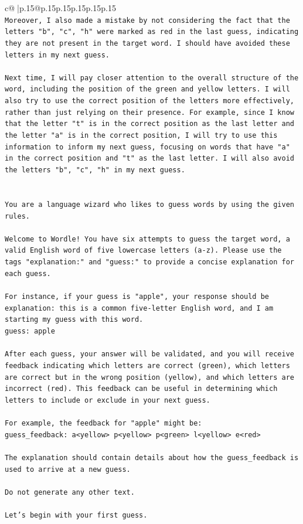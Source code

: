 \documentclass{article}
\begin{document}
{\begin{supertabular}{c@{$\;$}|p{.15\linewidth}@{}p{.15\linewidth}p{.15\linewidth}p{.15\linewidth}p{.15\linewidth}p{.15\linewidth}}
{{{\\ 
\texttt{Moreover, I also made a mistake by not considering the fact that the letters "b", "c", "h" were marked as red in the last guess, indicating they are not present in the target word. I should have avoided these letters in my next guess.} \\
\\ 
\texttt{Next time, I will pay closer attention to the overall structure of the word, including the position of the green and yellow letters. I will also try to use the correct position of the letters more effectively, rather than just relying on their presence. For example, since I know that the letter "t" is in the correct position as the last letter and the letter "a" is in the correct position, I will try to use this information to inform my next guess, focusing on words that have "a" in the correct position and "t" as the last letter. I will also avoid the letters "b", "c", "h" in my next guess.} \\
\\ 
\\ 
\texttt{You are a language wizard who likes to guess words by using the given rules.} \\
\\ 
\texttt{Welcome to Wordle! You have six attempts to guess the target word, a valid English word of five lowercase letters (a{-}z). Please use the tags "explanation:" and "guess:" to provide a concise explanation for each guess.} \\
\\ 
\texttt{For instance, if your guess is "apple", your response should be} \\
\texttt{explanation: this is a common five{-}letter English word, and I am starting my guess with this word.} \\
\texttt{guess: apple} \\
\\ 
\texttt{After each guess, your answer will be validated, and you will receive feedback indicating which letters are correct (green), which letters are correct but in the wrong position (yellow), and which letters are incorrect (red). This feedback can be useful in determining which letters to include or exclude in your next guess.} \\
\\ 
\texttt{For example, the feedback for "apple" might be:} \\
\texttt{guess\_feedback: a<yellow> p<yellow> p<green> l<yellow> e<red>} \\
\\ 
\texttt{The explanation should contain details about how the guess\_feedback is used to arrive at a new guess.} \\
\\ 
\texttt{Do not generate any other text.} \\
\\ 
\texttt{Let's begin with your first guess.} \\
            }
        }
    }
     \\ \\


\end{supertabular}}
\end{document}
